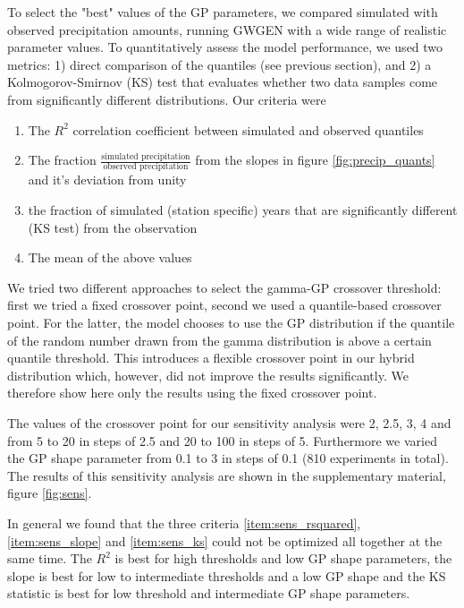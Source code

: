 \begin{refsection}
To select the "best" values of the GP parameters, we compared simulated with observed precipitation amounts, running GWGEN with a wide range of realistic parameter values. To quantitatively assess the model performance, we used two metrics: 1) direct comparison of the quantiles (see previous section), and 2) a Kolmogorov-Smirnov (KS) test that evaluates whether two data samples come from significantly different distributions. Our criteria were

\begin{enumerate}
	\item The $R^2$  correlation coefficient between simulated and observed quantiles \label{item:sens_rsquared}
	\item The fraction $\frac{\text{simulated precipitation}}{{\text{observed precipitation}}}$ from the slopes in figure \ref{fig:precip_quants} and it's deviation from unity \label{item:sens_slope}
	\item the fraction of simulated (station specific) years that are significantly different (KS test) from the observation \label{item:sens_ks}
	\item The mean of the above values \label{item:sens_mean}
\end{enumerate}

We tried two different approaches to select the gamma-GP crossover threshold: first we tried a fixed crossover point, second we used a quantile-based crossover point. For the latter, the model chooses to use the GP distribution if the quantile of the random number drawn from the gamma distribution is above a certain quantile threshold. This introduces a flexible crossover point in our hybrid distribution which, however, did not improve the results significantly. We therefore show here only the results using the fixed crossover point.

The values of the crossover point for  our sensitivity analysis were 2, 2.5, 3, 4 and from 5 to 20 in steps of 2.5 and 20 to 100 in steps of 5. Furthermore we varied the GP shape parameter from 0.1 to 3 in steps of 0.1 (810 experiments in total). The results of this sensitivity analysis are shown in the supplementary material, figure \ref{fig:sens}.

In general we found that the three criteria \ref{item:sens_rsquared}, \ref{item:sens_slope} and \ref{item:sens_ks} could not be optimized all together at the same time. The $R^2$ is best for high thresholds and low GP shape parameters, the slope is best for low to intermediate thresholds and a low GP shape and the KS statistic is best for low threshold and intermediate GP shape parameters.


\end{refsection}
